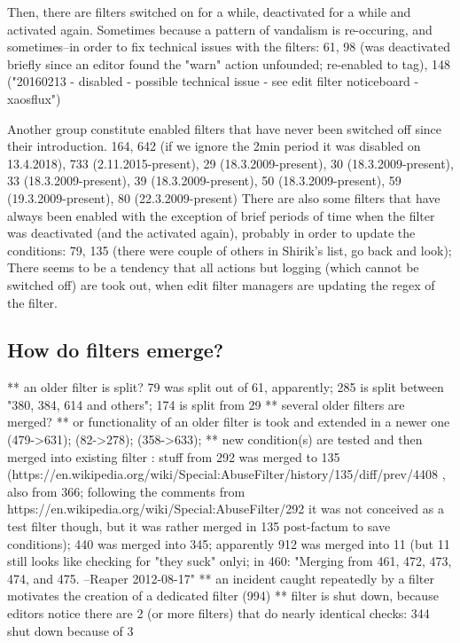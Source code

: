 Then, there are filters switched on for a while, deactivated for a while and activated again.
Sometimes because a pattern of vandalism is re-occuring, and sometimes–in order to fix technical issues with the filters: 61, 98 (was deactivated briefly since an editor found the "warn" action unfounded; re-enabled to tag), 148 ("20160213 - disabled - possible technical issue - see edit filter noticeboard - xaosflux")

Another group constitute enabled filters that have never been switched off since their introduction.
  164, 642 (if we ignore the 2min period it was disabled on 13.4.2018), 733 (2.11.2015-present), 29 (18.3.2009-present), 30 (18.3.2009-present), 33 (18.3.2009-present), 39 (18.3.2009-present), 50 (18.3.2009-present), 59 (19.3.2009-present), 80 (22.3.2009-present)
There are also some filters that have always been enabled with the exception of brief periods of time when the filter was deactivated (and the activated again), probably in order to update the conditions: 79, 135 (there were couple of others in Shirik's list, go back and look);
There seems to be a tendency that all actions but logging (which cannot be switched off) are took out, when edit filter managers are updating the regex of the filter.

\subsection{How do filters emerge?}
  ** an older filter is split? 79 was split out of 61, apparently; 285 is split between "380, 384, 614 and others"; 174 is split from 29
  ** several older filters are merged?
  ** or functionality of an older filter is took and extended in a newer one (479->631); (82->278); (358->633);
  ** new condition(s) are tested and then merged into existing filter : stuff from 292 was merged to 135 (https://en.wikipedia.org/wiki/Special:AbuseFilter/history/135/diff/prev/4408 , also from 366; following the comments from https://en.wikipedia.org/wiki/Special:AbuseFilter/292 it was not conceived as a test filter though, but it was rather merged in 135 post-factum to save conditions); 440 was merged into 345; apparently 912 was merged into 11 (but 11 still looks like checking for "they suck" only^^); in 460: "Merging from 461, 472, 473, 474, and 475. --Reaper 2012-08-17"
  ** an incident caught repeatedly by a filter motivates the creation of a dedicated filter (994)
  ** filter is shut down, because editors notice there are 2 (or more filters) that do nearly identical checks: 344 shut down because of 3

